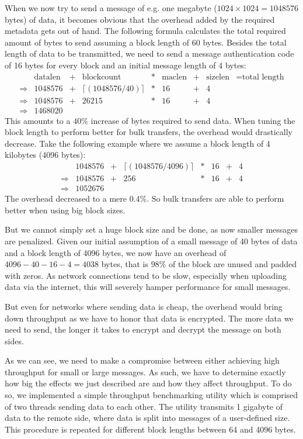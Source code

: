 When we now try to send a message of e.g. one megabyte ($1024 \times 1024 = 1048576$ bytes) of data, it becomes obvious that the overhead added by the required metadata gets out of hand.
The following formula calculates the total required amount of bytes to send assuming a block length of 60 bytes.
Besides the total length of data to be transmitted, we need to send a message authentication code of 16 bytes for every block and an initial message length of 4 bytes:
\begin{align*}
    &\text{datalen} &+ &\text{blockcount} &* &\text{maclen} &+ &\text{sizelen} &= \text{total length}\\
    \Rightarrow &1048576 &+ & \lceil(1048576 / 40)\rceil &* &16 &+ &4\\
    \Rightarrow &1048576 &+ & 26215 &* &16 &+ &4\\
    \Rightarrow &1468020
\end{align*}
This amounts to a $40\%$ increase of bytes required to send data.
When tuning the block length to perform better for bulk transfers, the overhead would drastically decrease.
Take the following example where we assume a block length of 4 kilobytes (4096 bytes):
\begin{align*}
    &1048576 &+ &\lceil(1048576 / 4096)\rceil &* &16 &+ &4\\
    \Rightarrow &1048576 &+ &256 &* &16 &+ &4\\
    \Rightarrow &1052676
\end{align*}
The overhead decreased to a mere $0.4\%$.
So bulk transfers are able to perform better when using big block sizes.

But we cannot simply set a huge block size and be done, as now smaller messages are penalized.
Given our initial assumption of a small message of 40 bytes of data and a block length of 4096 bytes, we now have an overhead of $4096 - 40 - 16 - 4 = 4038$ bytes, that is $98\%$ of the block are unused and padded with zeros.
As network connections tend to be slow, especially when uploading data via the internet, this will severely hamper performance for small messages.

But even for networks where sending data is cheap, the overhead would bring down throughput as we have to honor that data is encrypted.
The more data we need to send, the longer it takes to encrypt and decrypt the message on both sides.

\medskip

As we can see, we need to make a compromise between either achieving high throughput for small or large messages.
As such, we have to determine exactly how big the effects we just described are and how they affect throughput.
To do so, we implemented a simple throughput benchmarking utility which is comprised of two threads sending data to each other.
The utility transmits 1 gigabyte of data to the remote side, where data is split into messages of a user-defined size.
This procedure is repeated for different block lengths between 64 and 4096 bytes.

